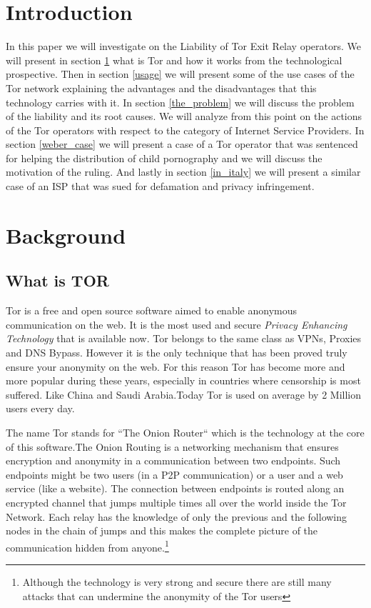 \documentclass[runningheads,a4paper]{llncs}
\begin{document}
\section*{Introduction}

In this paper we will investigate on the Liability of Tor Exit Relay operators. We will present in section \ref{background} what is Tor and how it works from the technological prospective. Then in section \ref{usage} we will present some of the use cases of the Tor network explaining the advantages and the disadvantages that this technology carries with it. In section \ref{the_problem} we will discuss the problem of the liability and its root causes. We will analyze from this point on the actions of the Tor operators with respect to the category of Internet Service Providers. In section \ref{weber_case} we will present a case of a Tor operator that was sentenced for helping the distribution of child pornography and we will discuss the motivation of the ruling. And lastly in section \ref{in_italy} we will present a similar case of an ISP that was sued for defamation and privacy infringement.

\section{Background}\label{background}

\subsection{What is TOR}

Tor is a free and open source software aimed to enable anonymous communication on the web. It is the most used and secure \textit{Privacy Enhancing Technology} that is available now. Tor belongs to the same class as VPNs, Proxies and DNS Bypass. However it is the only technique that has been proved truly ensure your anonymity on the web. For this reason Tor has become more and more popular during these years, especially in countries where censorship is most suffered. Like China and Saudi Arabia.Today Tor is used on average by 2 Million users every day.

The name Tor stands for ``The Onion Router`` 
which is the technology at the core of this software.The Onion Routing is a networking mechanism that ensures encryption and 
anonymity in a communication between two endpoints. Such endpoints might be two users (in a P2P communication) or a user and a web service (like a website). The connection between 
endpoints is routed along an encrypted channel that jumps multiple times all over the world inside the Tor Network. Each relay has the knowledge of only the previous and the 
following nodes in the chain of jumps and this makes the complete picture of the communication hidden from anyone.\footnote{Although the technology is very strong and secure there are still many attacks that can undermine the anonymity of the Tor users} \cite{CCDCOF}
\end{document}
